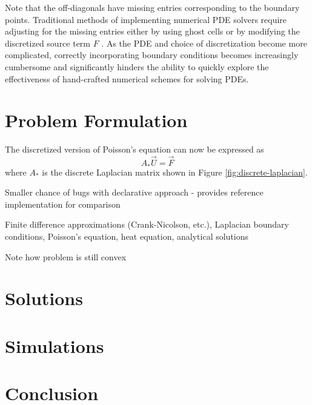 \documentclass[conference]{IEEEtran}
\begin{document}
Note that the off-diagonals have missing entries corresponding to the boundary points. Traditional methods of implementing numerical PDE solvers require adjusting for the missing entries either by using ghost cells  or by modifying the discretized source term $F$ . As the PDE and choice of discretization become more complicated, correctly incorporating boundary conditions becomes increasingly cumbersome and significantly hinders the ability to quickly explore the effectiveness of hand-crafted numerical schemes for solving PDEs.


\section{Problem Formulation}

The discretized version of Poisson's equation can now be expressed as
\begin{equation}
  A_* \vec{U} = \vec{F}
\end{equation}
where $A_*$ is the discrete Laplacian matrix shown in Figure \ref{fig:discrete-laplacian}.

\cite{dummy}

Smaller chance of bugs with declarative approach - provides reference implementation for comparison

Finite difference approximations (Crank-Nicolson, etc.), Laplacian boundary conditions, Poisson's equation, heat equation, analytical solutions

Note how problem is still convex


\section{Solutions}


\section{Simulations}


\section{Conclusion}





\end{document}
